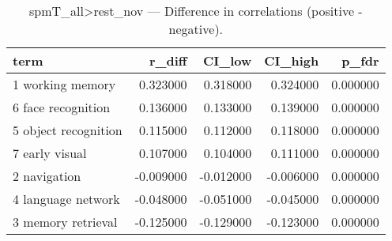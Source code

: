\begin{table}
\caption{spmT_all>rest_nov — Difference in correlations (positive - negative).}
\label{tab:spmT_all>rest_nov_diff}
\begin{tabular}{lrrrr}
\toprule
term & r\_diff & CI\_low & CI\_high & p\_fdr \\
\midrule
1 working memory & 0.323000 & 0.318000 & 0.324000 & 0.000000 \\
6 face recognition & 0.136000 & 0.133000 & 0.139000 & 0.000000 \\
5 object recognition & 0.115000 & 0.112000 & 0.118000 & 0.000000 \\
7 early visual & 0.107000 & 0.104000 & 0.111000 & 0.000000 \\
2 navigation & -0.009000 & -0.012000 & -0.006000 & 0.000000 \\
4 language network & -0.048000 & -0.051000 & -0.045000 & 0.000000 \\
3 memory retrieval & -0.125000 & -0.129000 & -0.123000 & 0.000000 \\
\bottomrule
\end{tabular}
\end{table}
